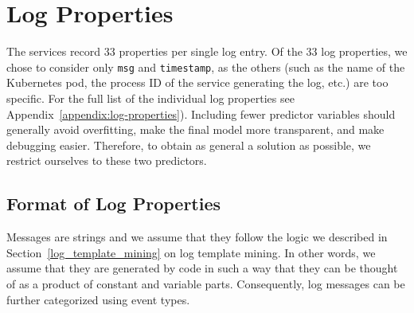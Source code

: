 \begin{table}[!h]
\centering
{}
\caption{Summary of all the log datasets we worked with in our research on anomaly detection.}
\label{table:datasets}
\end{table}

\section{Log Properties}
The services record 33 properties per single log entry. Of the 33 log properties, we chose to consider only \texttt{msg} and \texttt{timestamp}, as the others (such as the name of the Kubernetes pod, the process ID of the service generating the log, etc.) are too specific. For the full list of the individual log properties see Appendix~\ref{appendix:log-properties}).
Including fewer predictor variables should generally avoid overfitting, make the final model more transparent, and make debugging easier.
Therefore, to obtain as general a solution as possible, we restrict ourselves to these two predictors.

\subsection{Format of Log Properties}
Messages are strings and we assume that they follow the logic we described in Section~\ref{log_template_mining} on log template mining. In other words, we assume that they are generated by code in such a way that they can be thought of as a product of constant and variable parts. Consequently, log messages can be further categorized using event types.

